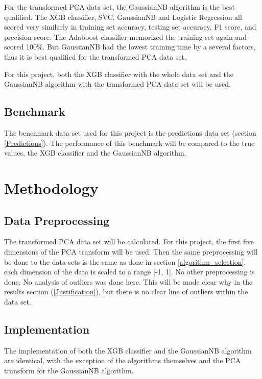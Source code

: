 \documentclass{article}
\begin{document}
\par
For the transformed PCA data set, the GaussianNB algorithm is the best qualified. The XGB classifier, SVC, GaussianNB and Logistic Regression all scored very similarly in training set accuracy, testing set accuracy, F1 score, and precision score. The Adaboost classifier memorized the training set again and scored 100\%. But GaussianNB had the lowest training time by a several factors, thus it is best qualified for the transformed PCA data set.

\par
For this project, both the XGB classifier with the whole data set and the GaussianNB algorithm with the transformed PCA data set will be used.


\subsection{Benchmark}
\par
The benchmark data set used for this project is the predictions data set (section \ref{Predictions}). The performance of this benchmark will be compared to the true values, the XGB classifier and the GaussianNB algorithm.

\section{Methodology}

\subsection{Data Preprocessing} \label{Actual_Preprocessing}
\par
The transformed PCA data set will be calculated. For this project, the first five dimensions of the PCA transform will be used. Then the same preprocessing will be done to the data sets is the same as done in section \ref{algorithm_selection}, each dimension of the data is scaled to a range [-1, 1]. No other preprocessing is done. No analysis of outliers was done here. This will be made clear why in the results section (\ref{Justification}), but there is no clear line of outliers within the data set.

\subsection{Implementation}
\par
The implementation of both the XGB classifier and the GaussianNB algorithm are identical, with the exception of the algorithms themselves and the PCA transform for the GaussianNB algorithm.
\end{document}
